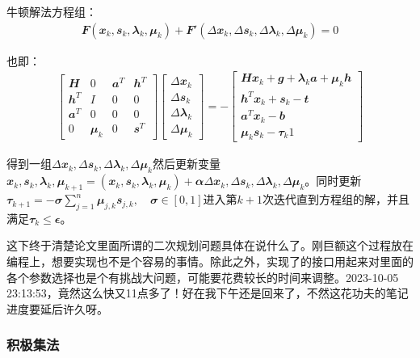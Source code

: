 牛顿解法方程组：
\begin{align}
  \mathbfit{F}(\mathbfit{x}_k,\mathbfit{s}_k,\mathbfit{\lambda}_k,\mathbfit{\mu}_k)+\mathbfit{F}'(\Delta\mathbfit{x}_k,\Delta\mathbfit{s}_k,\Delta\mathbfit{\lambda}_k,\Delta\mathbfit{\mu}_k)=0
\end{align}

也即：
\begin{align}
  \begin{bmatrix}
    \mathbfit{H} & 0& \mathbfit{a}^T & \mathbfit{h}^T\\
    \mathbfit{h}^T & I & 0 & 0\\
    \mathbfit{a}^T & 0 & 0 & 0\\
    0 & \mathbfit{\mu}_k & 0 & \mathbfit{s}^T
  \end{bmatrix}
  \begin{bmatrix}
    \Delta\mathbfit{x}_k\\
    \Delta\mathbfit{s}_k\\
    \Delta\mathbfit{\lambda}_k\\
    \Delta\mathbfit{\mu}_k
  \end{bmatrix}=-
  \begin{bmatrix}
    \mathbfit{H}\mathbfit{x}_k+\mathbfit{g}+\mathbfit{\lambda}_k\mathbfit{a}+\mathbfit{\mu}_k\mathbfit{h}\\
    \mathbfit{h}^T\mathbfit{x}_k+\mathbfit{s}_k-\mathbfit{t}\\
    \mathbfit{a}^T\mathbfit{x}_k-\mathbfit{b}\\
    \mathbfit{\mu}_k\mathbfit{s}_k-\mathbfit{\tau}_k\mathbfit{1}
  \end{bmatrix}
\end{align}

得到一组$\Delta\mathbfit{x}_k,\Delta\mathbfit{s}_k,\Delta\mathbfit{\lambda}_k,\Delta\mathbfit{\mu}_k$然后更新变量$\mathbfit{x}_k,\mathbfit{s}_k,\mathbfit{\lambda}_k,\mathbfit{\mu}_{k+1}=(\mathbfit{x}_k,\mathbfit{s}_k,\mathbfit{\lambda}_k,\mathbfit{\mu}_k)+\mathbfit{\alpha}\Delta\mathbfit{x}_k,\Delta\mathbfit{s}_k,\Delta\mathbfit{\lambda}_k,\Delta\mathbfit{\mu}_k$。同时更新$\mathbfit{\tau}_{k+1}=-\mathbfit{\sigma}\sum_{j=1}^{n}\mathbfit{\mu}_{j,k}\mathbfit{s}_{j,k}, \quad \mathbfit{\sigma} \in [0,1]$进入第$k+1$次迭代直到方程组的解，并且满足$\mathbfit{\tau}_k\leq\mathbfit{\epsilon}$。
\begin{note}
  这下终于清楚论文里面所谓的二次规划问题具体在说什么了。刚巨额这个过程放在编程上，想要实现也不是个容易的事情。除此之外，实现了的接口用起来对里面的各个参数选择也是个有挑战大问题，可能要花费较长的时间来调整。2023-10-05 23:13:53，竟然这么快又11点多了！好在我下午还是回来了，不然这花功夫的笔记进度要延后许久呀。
\end{note}

\subsubsection{积极集法}
